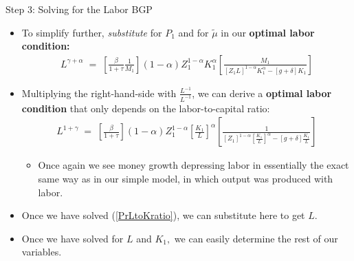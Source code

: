 \documentclass[10pt,c,aspectratio=1610,handout]{beamer}
\begin{document}
\begin{frame}{Step 3: Solving for the Labor BGP}%
  \begin{itemize}%
    \item[$\blacktriangleright$] To simplify further, \emph{substitute} for $P_{1}$ and for $\tilde{\mu }$ in our \textbf{optimal labor condition:}%
    \begin{align*}
      L^{\gamma+\alpha} \; = \; \left[ \frac{\beta}{1+\tau} \frac{1}{M_{1}} \right] (1-\alpha) Z_{1}^{1-\alpha} K_{1}^{\alpha} \left[ \frac{M_{1}}{\left[ Z_{1} L \right]^{1-\alpha} K_{1}^{\alpha} - \left[ g+\delta \right] K_{1}}\right]%
    \end{align*}%
    \pause%
    \item[$\blacktriangleright$] Multiplying the right-hand-side with $\frac{L^{-1}}{L^{-1}}$, we can derive a \textbf{optimal labor condition} that only depends on the labor-to-capital ratio:%
    \begin{align}%
      L^{1 +\gamma} \; = \; \left[ \frac{\beta}{1+\tau} \right] (1-\alpha) Z_{1}^{1-\alpha} \left[ \frac{K_{1}}{L} \right]^{\alpha} \left[ \frac{1}{\left[ Z_{1} \right]^{1-\alpha} \left[ \frac{K_{1}}{L} \right]^{\alpha} -\left[ g +\delta \right] \frac{K_{1}}{L}} \right] \label{BGFLabor}%
    \end{align}%
    \vspace*{-0.15in}%
    \begin{itemize}%
      \item[$\rightarrow$] Once again we see money growth depressing labor in essentially the exact same way as in our simple model, in which output was produced with labor.%
    \end{itemize}%
    \vspace*{0.15in}%
    \pause%
    \item[$\blacktriangleright$] Once we have solved (\ref{PrLtoKratio}), we can substitute here to get $L$.%
    \item[$\blacktriangleright$] Once we have solved for $L$ and $K_{1},$ we can easily determine the rest of our variables.%
  \end{itemize}%
\end{frame}%
\end{document}
